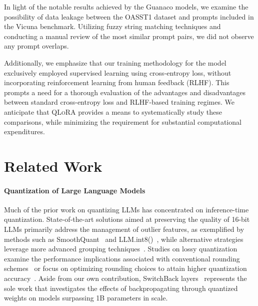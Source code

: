 In light of the notable results achieved by the {Guanaco} models, we examine the possibility of data leakage between the OASST1 dataset and prompts included in the Vicuna benchmark. Utilizing fuzzy string matching techniques and conducting a manual review of the most similar prompt pairs, we did not observe any prompt overlaps.

Additionally, we emphasize that our training methodology for the model exclusively employed supervised learning using cross-entropy loss, without incorporating reinforcement learning from human feedback (RLHF). This prompts a need for a thorough evaluation of the advantages and disadvantages between standard cross-entropy loss and RLHF-based training regimes. We anticipate that \textsc{QLoRA} provides a means to systematically study these comparisons, while minimizing the requirement for substantial computational expenditures.

\section{Related Work}

\paragraph{Quantization of Large Language Models} Much of the prior work on quantizing LLMs has concentrated on inference-time quantization. State-of-the-art solutions aimed at preserving the quality of 16-bit LLMs primarily address the management of outlier features, as exemplified by methods such as SmoothQuant~\citep{xiao2022smoothquant} and LLM.int8()~\citep{dettmers2022llm}, while alternative strategies leverage more advanced grouping techniques~\citep{park2022nuqmm, yao2022zeroquant}. Studies on lossy quantization examine the performance implications associated with conventional rounding schemes~\citep{dettmers2022case,zeng2022glm,pope2022efficiently} or focus on optimizing rounding choices to attain higher quantization accuracy~\citep{frantar2022gptq}. Aside from our own contribution, SwitchBack layers~\citep{wortsman2023stable} represents the sole work that investigates the effects of backpropagating through quantized weights on models surpassing 1B parameters in scale.

